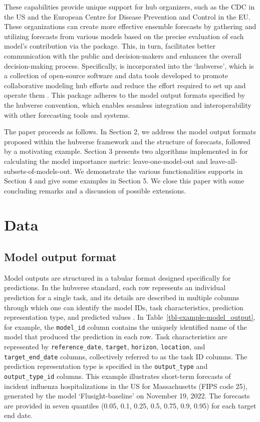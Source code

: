 \documentclass[
  article,
  shortnames,
  notitle]{jss}
\begin{document}
These capabilities provide unique support for hub organizers, such as
the CDC in the US and the European Centre for Disease Prevention and
Control in the EU. These organizations can create more effective
ensemble forecasts by gathering and utilizing forecasts from various
models based on the precise evaluation of each model's contribution via
the  package. This, in turn, facilitates better
communication with the public and decision-makers and enhances the
overall decision-making process. Specifically,  is
incorporated into the `hubverse', which is a collection of open-source
software and data tools developed to promote collaborative modeling hub
efforts and reduce the effort required to set up and operate them
\citep{hubverse_docs}. This package adheres to the model output formats
specified by the hubverse convention, which enables seamless integration
and interoperability with other forecasting tools and systems.

The paper proceeds as follows. In Section 2, we address the model output
formats proposed within the hubverse framework and the structure of
forecasts, followed by a motivating example. Section 3 presents two
algorithms implemented in  for calculating the
model importance metric: leave-one-model-out and
leave-all-subsets-of-models-out. We demonstrate the various
functionalities  supports in Section 4 and give
some examples in Section 5. We close this paper with some concluding
remarks and a discussion of possible extensions.

\section{Data}\label{sec:data}

\subsection{Model output format}\label{subsec:model_output_format}

Model outputs are structured in a tabular format designed specifically
for predictions. In the hubverse standard, each row represents an
individual prediction for a single task, and its details are described
in multiple columns through which one can identify the model IDs, task
characteristics, prediction representation type, and predicted values
\citep{Shandross2024}. In Table~\ref{tbl-example-model_output}, for
example, the \texttt{model\_id} column contains the uniquely identified
name of the model that produced the prediction in each row. Task
characteristics are represented by \texttt{reference\_date},
\texttt{target}, \texttt{horizon}, \texttt{location}, and
\texttt{target\_end\_date} columns, collectively referred to as the task
ID columns. The prediction representation type is specified in the
\texttt{output\_type} and \texttt{output\_type\_id} columns. This
example illustrates short-term forecasts of incident influenza
hospitalizations in the US for Massachusetts (FIPS code 25), generated
by the model `Flusight-baseline' on November 19, 2022. The forecasts are
provided in seven quantiles (0.05, 0.1, 0.25, 0.5, 0.75, 0.9, 0.95) for
each target end date.
\end{document}
